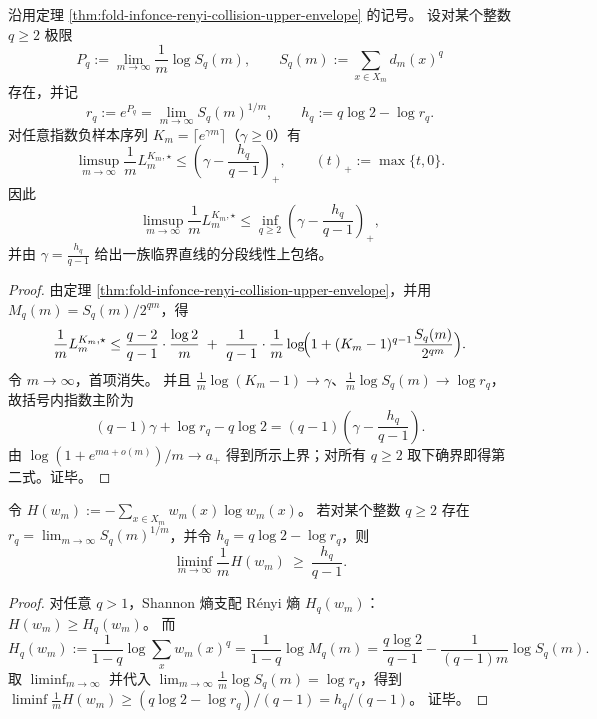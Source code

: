 \begin{corollary}[指数负样本尺度下的分段线性上包络]\label{cor:fold-infonce-exponential-negative-phase-envelope}
沿用定理 \ref{thm:fold-infonce-renyi-collision-upper-envelope} 的记号。
设对某个整数 \(q\ge 2\) 极限
\[
P_q:=\lim_{m\to\infty}\frac{1}{m}\log S_q(m),
\qquad
S_q(m):=\sum_{x\in X_m}d_m(x)^q
\]
存在，并记
\[
r_q:=e^{P_q}=\lim_{m\to\infty}S_q(m)^{1/m},
\qquad
h_q:=q\log 2-\log r_q.
\]
对任意指数负样本序列 \(K_m=\lceil e^{\gamma m}\rceil\)（\(\gamma\ge 0\)）有
\[
\limsup_{m\to\infty}\frac{1}{m}L_{m}^{K_m,\star}
\le
\left(\gamma-\frac{h_q}{q-1}\right)_{+},
\qquad
(t)_{+}:=\max\{t,0\}.
\]
因此
\[
\limsup_{m\to\infty}\frac{1}{m}L_{m}^{K_m,\star}
\le
\inf_{q\ge 2}\left(\gamma-\frac{h_q}{q-1}\right)_{+},
\]
并由 \(\gamma=\frac{h_q}{q-1}\) 给出一族临界直线的分段线性上包络。
\end{corollary}
\begin{proof}
由定理 \ref{thm:fold-infonce-renyi-collision-upper-envelope}，并用
\(
M_q(m)=S_q(m)/2^{qm}
\)，得
\[
\frac{1}{m}L_{m}^{K_m,\star}
\le
\frac{q-2}{q-1}\cdot\frac{\log 2}{m}
\;+\;
\frac{1}{q-1}\cdot\frac{1}{m}\log\!\Bigl(1+(K_m-1)^{q-1}\frac{S_q(m)}{2^{qm}}\Bigr).
\]
令 \(m\to\infty\)，首项消失。
并且 \(\frac{1}{m}\log(K_m-1)\to\gamma\)、\(\frac{1}{m}\log S_q(m)\to\log r_q\)，故括号内指数主阶为
\[
(q-1)\gamma+\log r_q-q\log 2=(q-1)\left(\gamma-\frac{h_q}{q-1}\right).
\]
由 \(\log(1+e^{m a+o(m)})/m\to a_{+}\) 得到所示上界；对所有 \(q\ge 2\) 取下确界即得第二式。证毕。
\end{proof}

\begin{corollary}\label{cor:fold-shannon-entropy-rate-lower-bound-from-rq}
令 \(H(w_m):=-\sum_{x\in X_m}w_m(x)\log w_m(x)\)。
若对某个整数 \(q\ge 2\) 存在 \(r_q=\lim_{m\to\infty}S_q(m)^{1/m}\)，并令 \(h_q=q\log 2-\log r_q\)，则
\[
\liminf_{m\to\infty}\frac{1}{m}H(w_m)\ \ge\ \frac{h_q}{q-1}.
\]
\end{corollary}
\begin{proof}
对任意 \(q>1\)，Shannon 熵支配 Rényi 熵 \(H_q(w_m)\)：
\(
H(w_m)\ge H_q(w_m)
\)。
而
\[
H_q(w_m):=\frac{1}{1-q}\log\sum_x w_m(x)^q
=\frac{1}{1-q}\log M_q(m)
=\frac{q\log 2}{q-1}-\frac{1}{(q-1)m}\log S_q(m).
\]
取 \(\liminf_{m\to\infty}\) 并代入 \(\lim_{m\to\infty}\frac{1}{m}\log S_q(m)=\log r_q\)，得到
\(
\liminf \frac{1}{m}H(w_m)\ge (q\log 2-\log r_q)/(q-1)=h_q/(q-1)
\)。
证毕。
\end{proof}


